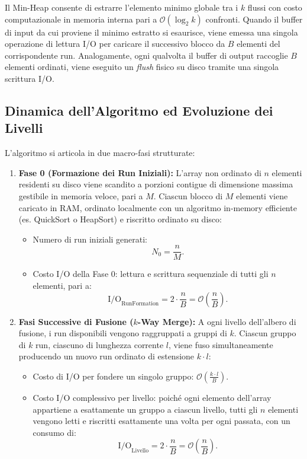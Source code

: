 Il Min-Heap consente di estrarre l'elemento minimo globale tra i $k$ flussi con costo computazionale in memoria interna pari a $\mathcal{O}(\log_2 k)$ confronti. Quando il buffer di input da cui proviene il minimo estratto si esaurisce, viene emessa una singola operazione di lettura I/O per caricare il successivo blocco da $B$ elementi del corrispondente run. Analogamente, ogni qualvolta il buffer di output raccoglie $B$ elementi ordinati, viene eseguito un \textit{flush} fisico su disco tramite una singola scrittura I/O.

\subsection{Dinamica dell'Algoritmo ed Evoluzione dei Livelli}
\label{subsec:multiway-dynamics}

L'algoritmo si articola in due macro-fasi strutturate:

\begin{enumerate}
  \item \textbf{Fase 0 (Formazione dei Run Iniziali):}
  L'array non ordinato di $n$ elementi residenti su disco viene scandito a porzioni contigue di dimensione massima gestibile in memoria veloce, pari a $M$. Ciascun blocco di $M$ elementi viene caricato in RAM, ordinato localmente con un algoritmo in-memory efficiente (es. QuickSort o HeapSort) e riscritto ordinato su disco:
  \begin{itemize}
    \item Numero di run iniziali generati:
    \begin{equation}
      N_0 = \frac{n}{M}.
    \end{equation}
    \item Costo I/O della Fase 0: lettura e scrittura sequenziale di tutti gli $n$ elementi, pari a:
    \begin{equation}
      \mathrm{I/O}_{\text{RunFormation}} = 2 \cdot \frac{n}{B} = \mathcal{O}\left(\frac{n}{B}\right).
    \end{equation}
  \end{itemize}

  \item \textbf{Fasi Successive di Fusione ($k$-Way Merge):}
  A ogni livello dell'albero di fusione, i run disponibili vengono raggruppati a gruppi di $k$. Ciascun gruppo di $k$ run, ciascuno di lunghezza corrente $l$, viene fuso simultaneamente producendo un nuovo run ordinato di estensione $k \cdot l$:
  \begin{itemize}
    \item Costo di I/O per fondere un singolo gruppo: $\mathcal{O}\left(\frac{k \cdot l}{B}\right)$.
    \item Costo I/O complessivo per livello: poiché ogni elemento dell'array appartiene a esattamente un gruppo a ciascun livello, tutti gli $n$ elementi vengono letti e riscritti esattamente una volta per ogni passata, con un consumo di:
    \begin{equation}
      \mathrm{I/O}_{\text{Livello}} = 2 \cdot \frac{n}{B} = \mathcal{O}\left(\frac{n}{B}\right).
    \end{equation}
  \end{itemize}
\end{enumerate}

